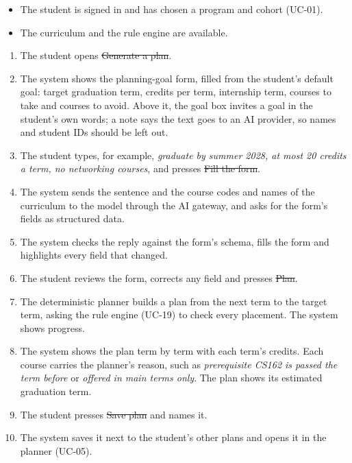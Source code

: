 \begin{itemize}
  \item The student is signed in and has chosen a program and cohort (UC-01).
  \item The curriculum and the rule engine are available.
\end{itemize}

\begin{enumerate}
  \item The student opens \st{Generate a plan}.
  \item The system shows the planning-goal form, filled from the student's default goal: target graduation term, credits
        per term, internship term, courses to take and courses to avoid. Above it, the goal box invites a goal in the
        student's own words; a note says the text goes to an AI provider, so names and student IDs should be left out.
  \item The student types, for example, \emph{graduate by summer 2028, at most 20 credits a term, no networking courses},
        and presses \st{Fill the form}.
  \item The system sends the sentence and the course codes and names of the curriculum to the model through the AI
        gateway, and asks for the form's fields as structured data.
  \item The system checks the reply against the form's schema, fills the form and highlights every field that changed.
  \item The student reviews the form, corrects any field and presses \st{Plan}.
  \item The deterministic planner builds a plan from the next term to the target term, asking the rule engine (UC-19) to
        check every placement. The system shows progress.
  \item The system shows the plan term by term with each term's credits. Each course carries the planner's reason, such as
        \emph{prerequisite CS162 is passed the term before} or \emph{offered in main terms only}. The plan shows its
        estimated graduation term.
  \item The student presses \st{Save plan} and names it.
  \item The system saves it next to the student's other plans and opens it in the planner (UC-05).
\end{enumerate}

